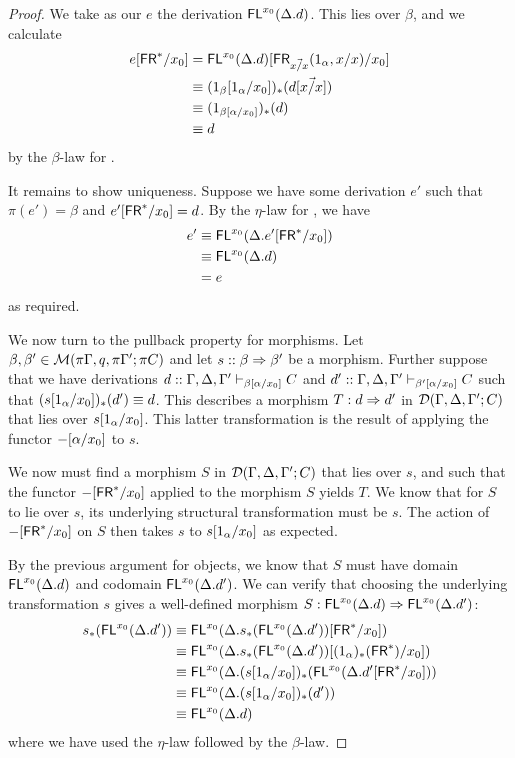 \begin{proof}
We take as our $e$ the derivation $\mathsf{FL}^{x_0}(\Delta.d)$. This lies over $\beta$, and we calculate
\begin{align*}
e[\mathsf{FR}^*/x_0] &= \mathsf{FL}^{x_0}(\Delta.d)[\mathsf{FR}_{\vec{x/x}}(1_\alpha,{x}/x)/x_0] \\
&\equiv (1_\beta[1_\alpha/x_0])_*(d[\vec{{x}/x}])\\
&\equiv (1_{\beta[\alpha/x_0]})_*(d)\\
&\equiv d
\end{align*}
by the $\beta$-law for . 

It remains to show uniqueness. Suppose we have some derivation $e'$ such that $\pi(e') = \beta$ and $e'[\mathsf{FR}^*/x_0] = d$. By the $\eta$-law for , we have
\begin{align*}
e' &\equiv \mathsf{FL}^{x_0}(\Delta.e'[\mathsf{FR}^*/x_0])\\
&\equiv \mathsf{FL}^{x_0}(\Delta.d)\\
&= e
\end{align*}
as required.

We now turn to the pullback property for morphisms. Let $\beta, \beta' \in \mathcal{M}(\pi\Gamma, q, \pi\Gamma'; \pi C)$ and let $s :: \beta \Rightarrow \beta'$ be a morphism. Further suppose that we have derivations $d :: \Gamma, \Delta, \Gamma' \vdash_{\beta[\alpha/x_0]} C$ and $d' :: \Gamma, \Delta, \Gamma' \vdash_{\beta'[\alpha/x_0]} C$ such that $(s[1_\alpha/x_0])_*(d') \equiv d$. This describes a morphism $T : d \Rightarrow d'$ in $\mathcal{D}(\Gamma,\Delta,\Gamma';C)$ that lies over $s[1_\alpha/x_0]$. This latter transformation is the result of applying the functor $-[\alpha/x_0]$ to $s$.

We now must find a morphism $S$ in $\mathcal{D}(\Gamma,\Delta,\Gamma';C)$ that lies over $s$, and such that the functor $-[\mathsf{FR}^*/x_0]$ applied to the morphism $S$ yields $T$. We know that for $S$ to lie over $s$, its underlying structural transformation must be $s$. The action of $-[\mathsf{FR}^*/x_0]$ on $S$ then takes $s$ to $s[1_\alpha/x_0]$ as expected.

By the previous argument for objects, we know that $S$ must have domain $\mathsf{FL}^{x_0}(\Delta.d)$ and codomain $\mathsf{FL}^{x_0}(\Delta.d')$. We can verify that choosing the underlying transformation $s$ gives a well-defined morphism $S : \mathsf{FL}^{x_0}(\Delta.d) \Rightarrow \mathsf{FL}^{x_0}(\Delta.d')$:
\begin{align*}
s_*( \mathsf{FL}^{x_0}(\Delta.d')) &\equiv \mathsf{FL}^{x_0}(\Delta.s_*( \mathsf{FL}^{x_0}(\Delta.d'))[\mathsf{FR}^*/x_0])\\
&\equiv \mathsf{FL}^{x_0}(\Delta.s_*( \mathsf{FL}^{x_0}(\Delta.d'))[(1_\alpha)_*(\mathsf{FR}^*)/x_0])\\
&\equiv \mathsf{FL}^{x_0}(\Delta.(s[1_\alpha/x_0])_*( \mathsf{FL}^{x_0}(\Delta.d'[\mathsf{FR}^*/x_0]))\\
&\equiv \mathsf{FL}^{x_0}(\Delta.(s[1_\alpha/x_0])_*(d') )\\
&\equiv \mathsf{FL}^{x_0}(\Delta.d)
\end{align*}
where we have used the $\eta$-law followed by the $\beta$-law. 


\end{proof}
